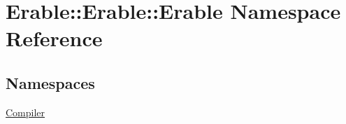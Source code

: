 \hypertarget{namespace_erable_1_1_erable_1_1_erable}{}\section{Erable\+::Erable\+::Erable Namespace Reference}
\label{namespace_erable_1_1_erable_1_1_erable}
\subsection*{Namespaces}
\begin{DoxyCompactItemize}
\item 
 \mbox{\hyperlink{namespace_erable_1_1_erable_1_1_erable_1_1_compiler}{Compiler}}
\end{DoxyCompactItemize}
